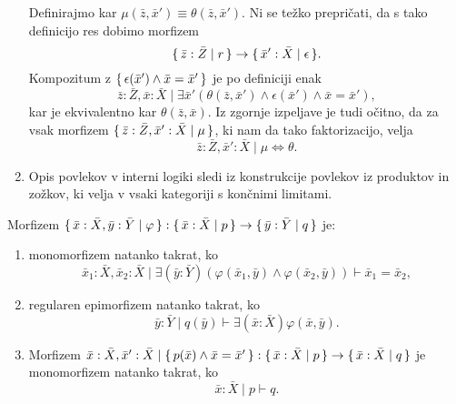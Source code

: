 \documentclass[../kategoricna_logika.tex]{subfiles}
\begin{document}
\begin{dokaz}
\begin{enumerate}[label=(\roman*)]
    Definirajmo kar
    $\mu(\bar{z},\bar{x}') \equiv \theta(\bar{z},\bar{x}')$. Ni se težko prepričati, da s tako
    definicijo res dobimo morfizem
    $$\lbrace\,\bar{z}:\bar{Z} \mid r\,\rbrace \to \lbrace\,\bar{x}':\bar{X} \mid \epsilon\,\rbrace.$$
    Kompozitum z
    $\lbrace\,\epsilon(\bar{x}') \land \bar{x} = \bar{x}'\,\rbrace$ je po definiciji enak
    \[ \bar{z}:\bar{Z}, \bar{x}:\bar{X} \mid \exists \bar{x}' (\theta(\bar{z},\bar{x}') \land \epsilon(\bar{x}') \land \bar{x}=\bar{x}'),\]
    kar je ekvivalentno kar $\theta(\bar{z},\bar{x})$.  Iz
    zgornje izpeljave je tudi očitno, da za vsak morfizem $\lbrace\,\bar{z}:\bar{Z},\bar{x}':\bar{X} \mid \mu\,\rbrace$,
    ki nam da tako faktorizacijo, velja
    \[\bar{z}:\bar{Z},\bar{x}':\bar{X} \mid \mu \iff \theta.\]

  \item Opis povlekov v interni logiki sledi iz konstrukcije povlekov
    iz produktov in zožkov, ki velja v vsaki kategoriji s končnimi
    limitami.
  \end{enumerate}
\end{dokaz}
\begin{lema}\label{lema:morfizmi-v-sintakticni-kategoriji}
  Morfizem
  $\lbrace\,\bar{x}:\bar{X},\bar{y}:\bar{Y} \mid \varphi\,\rbrace : \lbrace\,\bar{x}:\bar{X} \mid  p\,\rbrace \to
  \lbrace\,\bar{y}:\bar{Y} \mid  q\,\rbrace$ je:
  \begin{enumerate}[label=(\roman*)]
  \item monomorfizem natanko takrat, ko
      $$\bar{x}_1:\bar{X},\bar{x}_{2}:\bar{X} \mid \exists (\bar{y}:\bar{Y}) \left( \varphi(\bar{x}_1,\bar{y}) \wedge \varphi(\bar{x}_2,\bar{y}) \right) \vdash \bar{x}_1 = \bar{x}_2 ,$$
    \item regularen epimorfizem natanko takrat, ko
      $$\bar{y}:\bar{Y} \mid  q(\bar{y}) \vdash \exists (\bar{x}:\bar{X}) \varphi(\bar{x},\bar{y}).$$
    \item Morfizem
      $\bar{x}:\bar{X},\bar{x}':\bar{X} \mid \lbrace\,p(\bar{x}) \wedge \bar{x} = \bar{x}'\,\rbrace :
      \lbrace\,\bar{x}:\bar{X} \mid  p \,\rbrace \to \lbrace\,\bar{x}:\bar{X} \mid  q\,\rbrace$ je
      monomorfizem natanko takrat, ko
      $$\bar{x}:\bar{X} \mid p \vdash q.$$
    \end{enumerate}
  \end{lema}
\end{document}
